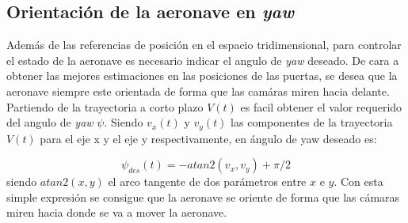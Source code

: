 \subsection{Orientación de la aeronave en \textit{yaw}}
Además de las referencias de posición en el espacio tridimensional, para controlar el estado de la aeronave es necesario indicar el angulo de \textit{yaw} deseado. De cara a obtener las mejores estimaciones en las posiciones de las puertas, se desea que la aeronave siempre este orientada de forma que las camáras miren hacia delante. Partiendo de la trayectoria a corto plazo $V(t)$ es facil obtener el valor requerido del angulo de \textit{yaw} $\psi$. Siendo $v_x(t)$ y $v_y(t)$ las componentes de la trayectoria $V(t)$ para el eje x y el eje y respectivamente, en ángulo de yaw deseado es:

\begin{equation}
	\psi_{des}(t) = -atan2(v_x,v_y) + \pi/2
\end{equation}
siendo $atan2(x,y)$ el arco tangente de dos parámetros entre $x$ e $y$. Con esta simple expresión se consigue que la aeronave se oriente de forma que las cámaras miren hacia donde se va a mover la aeronave.


















